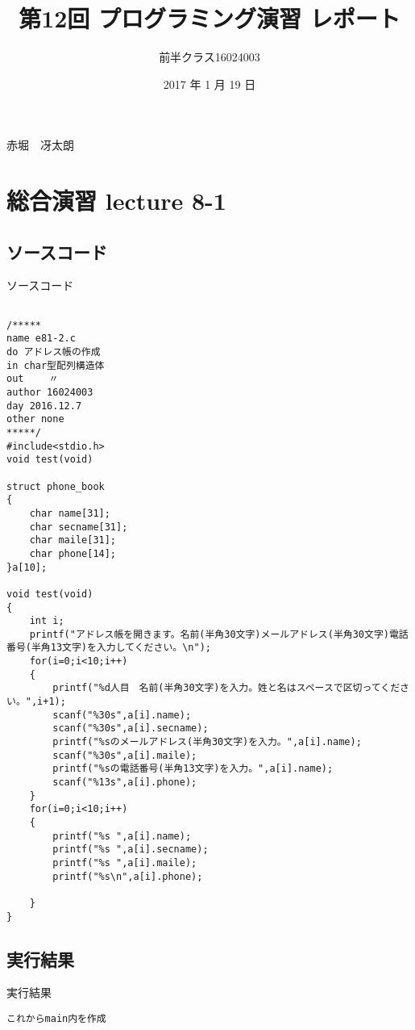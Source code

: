 \documentclass[a4j,titlepage]{jarticle}
\begin{document}

\title{第12回 プログラミング演習 レポート}

\author{前半クラス16024003}{赤堀　冴太朗}

\date{2017 年 1 月 19 日}
\maketitle


\section{総合演習 lecture 8-1}
\subsection{ソースコード}
\begin{breakitembox}[l]{ソースコード}
\begin{verbatim}

/*****
name e81-2.c
do アドレス帳の作成
in char型配列構造体
out　　 〃
author 16024003
day 2016.12.7
other none
*****/
#include<stdio.h>
void test(void)

struct phone_book
{
    char name[31];
    char secname[31];
    char maile[31];
    char phone[14];
}a[10];

void test(void)
{
    int i;
    printf("アドレス帳を開きます。名前(半角30文字)メールアドレス(半角30文字)電話番号(半角13文字)を入力してください。\n");
    for(i=0;i<10;i++)
    {
        printf("%d人目　名前(半角30文字)を入力。姓と名はスペースで区切ってください。",i+1);
        scanf("%30s",a[i].name);
        scanf("%30s",a[i].secname);
        printf("%sのメールアドレス(半角30文字)を入力。",a[i].name);
        scanf("%30s",a[i].maile);
        printf("%sの電話番号(半角13文字)を入力。",a[i].name);
        scanf("%13s",a[i].phone);
    }
    for(i=0;i<10;i++)
    {
        printf("%s ",a[i].name);
        printf("%s ",a[i].secname);
        printf("%s ",a[i].maile);
        printf("%s\n",a[i].phone);

    }
}
\end{verbatim}
\end{breakitembox}

\subsection{実行結果}
\begin{itembox}[l]{実行結果}
\begin{verbatim}
これからmain内を作成

\end{verbatim}
\end{itembox}
\end{document}
